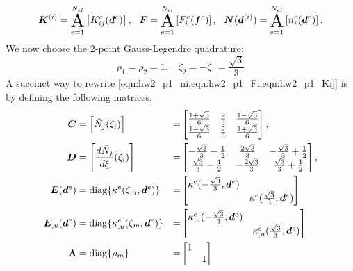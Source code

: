 \begin{equation}
    \bt{K}^{(i)} = \assem_{e=1}^{N_{el}} \left[K_{ij}^e(\bv{d}^e)\right], ~~ 
    \bv{F} = \assem_{e=1}^{N_{el}} \left[F_{i}^e (\bv{f}^e)\right], ~~ 
    \bv{N}(\bv{d}^{(i)}) = \assem_{e=1}^{N_{el}} \left[n_{i}^e(\bv{d}^e)\right].
\end{equation}
We now choose the 2-point Gauss-Legendre quadrature:
\begin{equation}
    \rho_1 = \rho_2 = 1, ~~~~ \zeta_2 = -\zeta_1 = \frac{\sqrt{3}}{3}
\end{equation}
A succinct way to rewrite \cref{eqn:hw2_p1_ni,eqn:hw2_p1_Fi,eqn:hw2_p1_Kij} is by defining the following matrices,
\begin{equation}\label{eqn:hw2_p1_matdef}
\begin{aligned}
    \bm{C} &= \left[\hat{N}_{j}(\zeta_i)\right] &=& \begin{bmatrix}
        \frac{1 + \sqrt{3}}{6} & \frac{2}{3} & \frac{1 - \sqrt{3}}{6} \\
        \frac{1 - \sqrt{3}}{6} & \frac{2}{3} & \frac{1 + \sqrt{3}}{6}
    \end{bmatrix}, \\
    \bm{D} &= \left[\frac{d\hat{N}_{j}}{d\xi}(\zeta_i)\right] &=& \begin{bmatrix}
        -\frac{\sqrt{3}}{3} - \frac{1}{2} & \frac{2\sqrt{3}}{3} & -\frac{\sqrt{3}}{3} + \frac{1}{2} \\
        \frac{\sqrt{3}}{3} - \frac{1}{2} & -\frac{2\sqrt{3}}{3} & \frac{\sqrt{3}}{3} + \frac{1}{2}
    \end{bmatrix}, \\
    \bm{E}(\bm{d}^e) &= \textrm{diag}\{\kappa^e(\zeta_m, \bm{d}^e)\} &=& \begin{bmatrix}
        \kappa^e(-\frac{\sqrt{3}}{3}, \bm{d}^e) & \\
        & \kappa^e(\frac{\sqrt{3}}{3}, \bm{d}^e) \\
    \end{bmatrix} \\
    \bm{E}_{,u}(\bm{d}^e) &= \textrm{diag}\{\kappa_{,u}^e(\zeta_m, \bm{d}^e)\} &=& \begin{bmatrix}
        \kappa_{,u}^e(-\frac{\sqrt{3}}{3}, \bm{d}^e) & \\
        & \kappa_{,u}^e(\frac{\sqrt{3}}{3}, \bm{d}^e) \\
    \end{bmatrix} \\
    \bm{\Lambda} &= \textrm{diag}\{\rho_m\} &=& \begin{bmatrix}
        1 & \\
        & 1 \\
    \end{bmatrix} \\
\end{aligned}
\end{equation}
